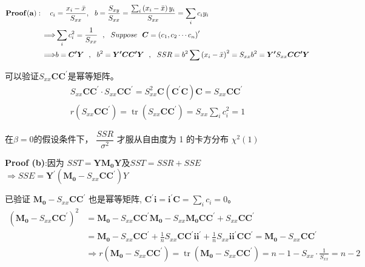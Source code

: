  \begin{myproof}
    \begin{align*}
        {\bf Proof (a)}: \quad  c_{i} & = \frac{x_{i}-\bar{x}}{S_{x x}} , \ \ b  = \frac{S_{x y}}{S_{x x}}  = \frac{\sum_{i}\left(x_{i}-\bar{x}\right) y_{i}}{S_{x x}}  = \sum_{i} c_{i}y_{i}\\
       \Longrightarrow & \sum_{i} c_{i}^{2}=\frac{1}{S_{x x}}  \ \  ,  \ \  Suppose \ \ \boldsymbol{C} =\left(c_{1}, c_{2} \cdots c_{n}\right)^{\prime} \\ 
       \Longrightarrow &  b=\boldsymbol{C^{\prime} Y}\ \  ,  \ \ b^{2}=\boldsymbol{ Y^{\prime} C C^{\prime} Y} \ \  , 
        \ \  S S R=b^{2} \sum\left(x_{i}-\bar{x}\right)^{2}=S_{x x} b^{2}=\boldsymbol{ Y^{\prime}} S_{x x} \boldsymbol{ C C^{\prime} Y }
    \end{align*} 

    可以验证$ S_{x x} \boldsymbol{C C^{\prime}} $是幂等矩阵。
    \begin{align*}
        S_{x x} \boldsymbol{C C^{\prime}} \cdot S_{x x} \boldsymbol{C C^{\prime}} =S_{x x}^{2} \boldsymbol{ C\left(C^{\prime} C\right) C} 
         =S_{x x} \boldsymbol{ C C^{\prime} } \\
        r\left(S_{x x} \boldsymbol{  C C^{\prime} } \right)=\operatorname{tr}\left(S_{x x} \boldsymbol{  C C^{\prime}}\right)=S_{x x} \sum_{i} c_{i}^{2}=1
    \end{align*}

    在$ \beta  = 0 $的假设条件下， $\dfrac{S S R}{\sigma^{2}}$ 才服从自由度为 1 的卡方分布 $ \chi^2(1) $ 

    {\bf Proof (b)}:因为 $ SST = \boldsymbol{YM_{0}Y} $及$ SST = SSR + SSE $ 
      $ \Longrightarrow  SSE = \boldsymbol{ Y^{\prime}} \left(\boldsymbol{ M_{0} } -S_{x x} \boldsymbol{ C C^{\prime}}\right) Y $

    已验证 $\boldsymbol{ M_{0 }}-S_{x x} \boldsymbol{ C C^{\prime}}$ 也是幂等矩阵, $\boldsymbol{ C^{\prime} i}=\boldsymbol{ i^{\prime} C}=\sum_{i} c_{i}=0$。
    \begin{align*}
        \left(\boldsymbol{ M_{0}} -S_{x x} \boldsymbol{ C C^{\prime}} \right)^{2} & 
        = \boldsymbol{ M_{0}}-S_{x x} \boldsymbol{ C C^{\prime} M_{0}} -S_{x x} \boldsymbol{  M_{0} C C^{\prime}} +S_{x x} \boldsymbol{ C C^{\prime} }\\
        & =\boldsymbol{ M_{0}}-S_{x x} \boldsymbol{ C C^{\prime} }+\frac{1}{n} 
         S_{x x} \boldsymbol{  C C^{\prime} i i^{\prime}} +\frac{1}{n} S_{x x} \boldsymbol{  i i^{\prime} C C^{\prime}} 
         =\boldsymbol{ M_{0}} -S_{x x} \boldsymbol{ C C^{\prime}} \\
        & \Longrightarrow r\left(\boldsymbol{ M_{0}} -S_{x x}\boldsymbol{ C C^{\prime} }\right)
        =\operatorname{tr}\left(\boldsymbol{  M_{0} } -S_{x x} \boldsymbol{  C C^{\prime}} \right)=n-1-S_{x x} \cdot \frac{1}{S_{x x}}=n-2
    \end{align*}


\end{myproof}
